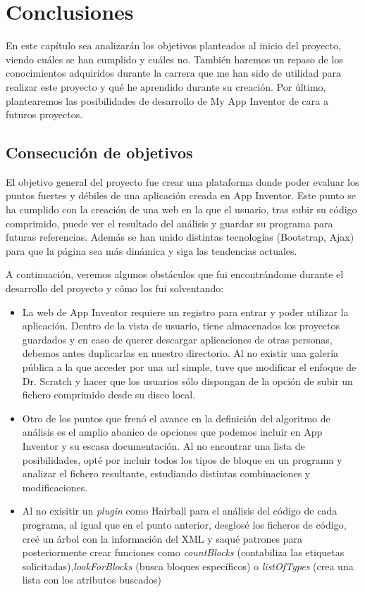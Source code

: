 \documentclass[a4paper, 12pt]{book}
\begin{document}
\cleardoublepage
\chapter{Conclusiones}
\label{chap:conclusiones}
En este capítulo sea analizarán los objetivos planteados al inicio del proyecto, viendo cuáles se han cumplido y cuáles no. También haremos un repaso de los conocimientos adquiridos durante la carrera que me han sido de utilidad para realizar este proyecto  y qué he aprendido durante su creación. Por último, plantearemos las posibilidades de desarrollo de My App Inventor de cara a futuros proyectos. 

\section{Consecución de objetivos}
\label{sec:consecucion-objetivos}
El objetivo general del proyecto fue crear una plataforma donde poder evaluar los puntos fuertes y débiles de una aplicación creada en App Inventor. Este punto se ha cumplido con la creación de una web en la que el usuario, tras subir su código comprimido, puede ver el resultado del análisis y guardar su programa para futuras referencias. Además se han unido distintas tecnologías (Bootstrap, Ajax) para que la página sea más dinámica y siga las tendencias actuales. 

A continuación, veremos algunos obstáculos que fui encontrándome durante el desarrollo del proyecto y cómo los fui solventando:

\begin{itemize}
	\item La web de App Inventor requiere un registro para entrar y poder utilizar la aplicación. Dentro de la vista de usuario, tiene almacenados los proyectos guardados y en caso de querer descargar aplicaciones de otras personas, debemos antes duplicarlas en nuestro directorio. Al no existir una galería pública a la que acceder por una url simple, tuve que modificar el enfoque de Dr. Scratch y hacer que los usuarios sólo dispongan de la opción de subir un fichero comprimido desde su disco local. 
	\item Otro de los puntos que frenó el avance en la definición del algoritmo de análisis es el amplio abanico de opciones que podemos incluir en App Inventor y su escasa documentación. Al no encontrar una lista de posibilidades, opté por incluir todos los tipos de bloque en un programa y analizar el fichero resultante, estudiando distintas combinaciones y modificaciones. 
	\item Al no exisitir un \textit{plugin} como Hairball para el análisis del código de cada programa, al igual que en el punto anterior, desglosé los ficheros de código, creé un árbol con la información del XML y saqué patrones para posteriormente crear funciones como \textit{countBlocks} (contabiliza las etiquetas solicitadas),\textit{lookForBlocks} (busca bloques específicos) o \textit{listOfTypes} (crea una lista con los atributos buscados)
\end{itemize}
\end{document}

